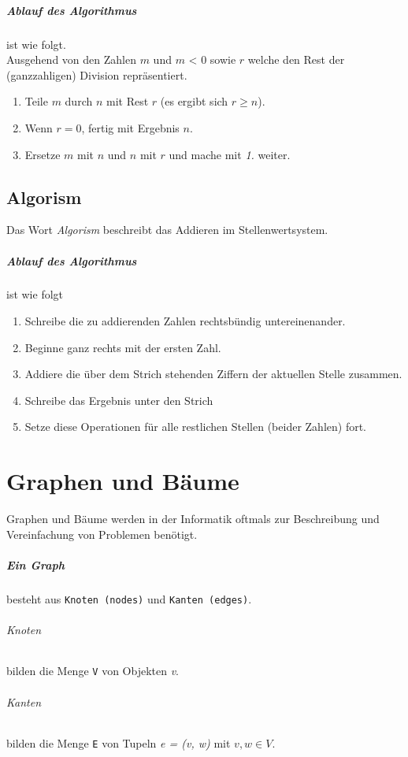 \documentclass{book}
\begin{document}
\paragraph*{Ablauf des Algorithmus} ist wie folgt. \\
Ausgehend von den Zahlen $m$ und $m$ < 0 sowie $r$ welche den Rest der (ganzzahligen) Division repräsentiert.
\begin{enumerate}
	\item Teile $m$ durch $n$ mit Rest $r$ (es ergibt sich $r \geq n$).
	\item Wenn $r = 0$, fertig mit Ergebnis $n$.
	\item Ersetze $m$ mit $n$ und $n$ mit $r$ und mache mit \textit{1.} weiter.
\end{enumerate}
\section{Algorism}
Das Wort \textit{Algorism} beschreibt das Addieren im Stellenwertsystem.
\paragraph*{Ablauf des Algorithmus} ist wie folgt
\begin{enumerate}
	\item Schreibe die zu addierenden Zahlen rechtsbündig untereinenander.
	\item Beginne ganz rechts mit der ersten Zahl.
	\item Addiere die über dem Strich stehenden Ziffern der aktuellen Stelle zusammen.
	\item Schreibe das Ergebnis unter den Strich
	\item Setze diese Operationen für alle restlichen Stellen (beider Zahlen) fort.
\end{enumerate}

\chapter{Graphen und Bäume}
Graphen und Bäume werden in der Informatik oftmals zur Beschreibung und Vereinfachung von  Problemen benötigt.
\paragraph*{Ein Graph} besteht aus \texttt{Knoten (nodes)} und \texttt{Kanten (edges)}.
\subparagraph*{Knoten} bilden die Menge \texttt{V} von Objekten \textit{v}.
\subparagraph*{Kanten} bilden die Menge \texttt{E} von Tupeln \textit{e = (v, w)} mit $v,w \in V$. 
\end{document}
